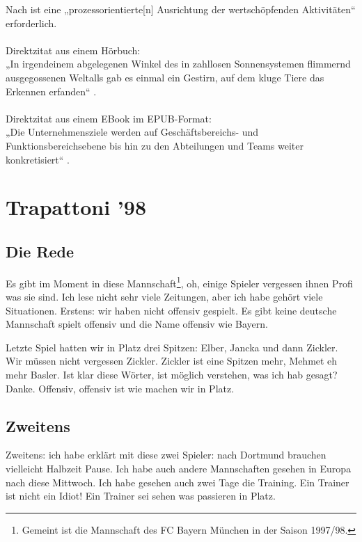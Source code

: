 Nach \textcite[40]{primarysource} ist eine „prozessorientierte[n] Ausrichtung der wertschöpfenden Aktivitäten“ erforderlich.\\
\\
Direktzitat aus einem Hörbuch:\\
„In irgendeinem abgelegenen Winkel des in zahllosen Sonnensystemen flimmernd ausgegossenen Weltalls gab es einmal ein Gestirn, auf dem kluge Tiere das Erkennen erfanden“ \parencite[2:31]{primarysource}.\\
\\
Direktzitat aus einem EBook im EPUB-Format:\\
„Die Unternehmensziele werden auf Geschäftsbereichs- und Funktionsbereichsebene bis hin
zu den Abteilungen und Teams weiter konkretisiert“ \parencite[Kap. 2.1]{primarysource}.

\section{Trapattoni '98}

\subsection{Die Rede}

Es gibt im Moment in diese Mannschaft\footnote{Gemeint ist die Mannschaft des FC Bayern München in der Saison 1997/98.}, oh, einige Spieler vergessen ihnen Profi was sie sind. Ich lese nicht sehr viele Zeitungen, aber ich habe gehört viele Situationen. Erstens: wir haben nicht offensiv gespielt. Es gibt keine deutsche Mannschaft spielt offensiv und die Name offensiv wie Bayern.

Letzte Spiel hatten wir in Platz drei Spitzen: Elber, Jancka und dann Zickler. Wir müssen nicht vergessen Zickler. Zickler ist eine Spitzen mehr, Mehmet eh mehr Basler. Ist klar diese Wörter, ist möglich verstehen, was ich hab gesagt? Danke. Offensiv, offensiv ist wie machen wir in Platz.

\subsection{Zweitens}

 Zweitens: ich habe erklärt mit diese zwei Spieler: nach Dortmund brauchen vielleicht Halbzeit Pause. Ich habe auch andere Mannschaften gesehen in Europa nach diese Mittwoch. Ich habe gesehen auch zwei Tage die Training. Ein Trainer ist nicht ein Idiot! Ein Trainer sei sehen was passieren in Platz.
 
